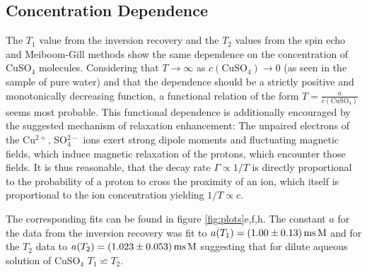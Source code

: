 \documentclass[a4paper]{scrartcl}
\numberwithin{equation}{section}
\numberwithin{figure}{section}
\numberwithin{table}{section}
\begin{document}
\subsection{Concentration Dependence}
The $T_1$ value from the inversion recovery and the $T_2$ values from the spin echo and Meiboom-Gill methods show the same dependence on the concentration of CuSO$_4$ molecules. Considering that $T\rightarrow\infty$ as $c(\text{CuSO}_4)\rightarrow 0$ (as seen in the sample of pure water) and that the dependence should be a strictly positive and monotonically decreasing function, a functional relation of the form $T=\frac{a}{c(\text{CuSO}_4)}$ seems most probable. This functional dependence is additionally encouraged by the suggested mechanism of relaxation enhancement: The unpaired electrons of the Cu$^{2+}$, SO$_4^{2-}$ ions exert strong dipole moments and fluctuating magnetic fields, which induce magnetic relaxation of the protons, which encounter those fields. It is thus reasonable, that the decay rate $\Gamma \propto 1/T$ is directly proportional to the probability of a proton to cross the proximity of an ion, which itself is proportional to the ion concentration yielding $1/T \propto c$. 

The corresponding fits can be found in figure \ref{fig:plots}e,f,h. The constant $a$ for the data from the inversion recovery was fit to $a(T_1)=(1.00\pm 0.13)\,\text{ms\,M}$ and for the $T_2$ data to $a(T_2)=(1.023\pm 0.053)\,\text{ms\,M}$ suggesting that for dilute aqueous solution of CuSO$_4$ $T_1\backsimeq T_2$.
\end{document}
